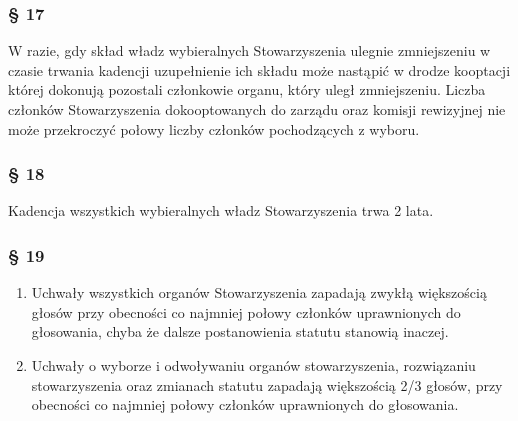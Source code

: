 \documentclass{article}
\newcommand{\myparagraph}[1]{\subsubsection*{#1}}
\begin{document}
\myparagraph{§ 17}
W razie, gdy skład władz wybieralnych Stowarzyszenia ulegnie zmniejszeniu w czasie trwania kadencji uzupełnienie ich składu może nastąpić w drodze kooptacji której dokonują pozostali członkowie organu, który uległ zmniejszeniu. Liczba członków Stowarzyszenia dokooptowanych do zarządu oraz komisji rewizyjnej nie może przekroczyć połowy liczby członków pochodzących z wyboru.

\myparagraph{§ 18}
Kadencja wszystkich wybieralnych władz Stowarzyszenia trwa 2 lata.

\myparagraph{§ 19}
\begin{enumerate}
\item
  Uchwały wszystkich organów Stowarzyszenia zapadają zwykłą większością głosów przy obecności co najmniej połowy członków uprawnionych do głosowania, chyba że dalsze postanowienia statutu stanowią inaczej.
\item
  Uchwały o wyborze i odwoływaniu organów stowarzyszenia, rozwiązaniu stowarzyszenia oraz zmianach statutu zapadają większością 2/3 głosów, przy obecności co najmniej połowy członków uprawnionych do głosowania.
\end{enumerate}
\end{document}
